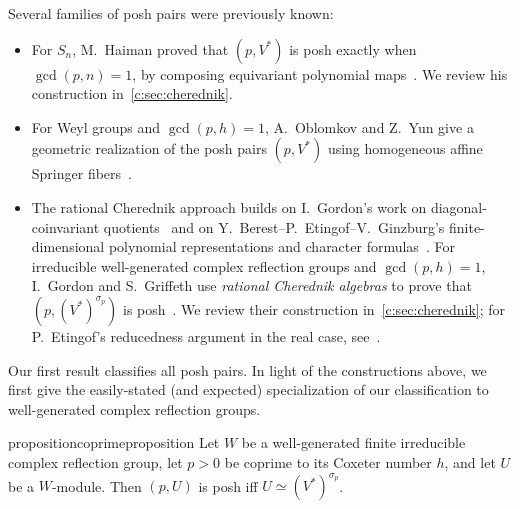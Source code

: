 \documentclass[11pt]{amsart}
\theoremstyle{definition}
\begin{document}
Several families of posh pairs were previously known:
\begin{itemize}
\item For $S_n$, M.~Haiman proved that $(p,V^*)$ is posh exactly when
$\gcd(p,n)=1$, by composing equivariant polynomial maps~\cite{Haiman}.
We review his construction in~\cref{c:sec:cherednik}.
\item For Weyl groups and $\gcd(p,h)=1$, A.~Oblomkov and Z.~Yun give
a geometric realization of the posh pairs $(p,V^*)$ using homogeneous affine Springer fibers~\cite{OblomkovYun}.
\item The rational Cherednik approach builds on I.~Gordon's work on
diagonal-coinvariant quotients~\cite{GordonDiagonal} and on
Y.~Berest--P.~Etingof--V.~Ginzburg's finite-dimensional polynomial
representations and character formulas~\cite{BEGFinite}.
For irreducible well-generated complex reflection groups and $\gcd(p,h)=1$,
I.~Gordon and S.~Griffeth use \emph{rational Cherednik algebras} to prove
that $(p,(V^*)^{\sigma_p})$ is posh~\cite[Theorem 2.11 and Section 2.18]{GG}.
We review their construction in~\cref{c:sec:cherednik}; for P.~Etingof's
reducedness argument in the real case, see~\cite[Section~12]{ARR}. %
\end{itemize}

Our first result classifies all posh pairs.  In light of the constructions above, we first give the easily-stated (and expected) specialization of our classification to well-generated complex reflection groups.

\begin{restatable}{proposition}{coprimeproposition}\label{prop:coprime-hsop}
Let $W$ be a well-generated finite irreducible complex reflection group,
let $p>0$ be coprime to its Coxeter number $h$, and let $U$ be a
$W$-module. Then $(p,U)$ is posh iff $U\simeq(V^*)^{\sigma_p}$.
\end{restatable}
\end{document}
